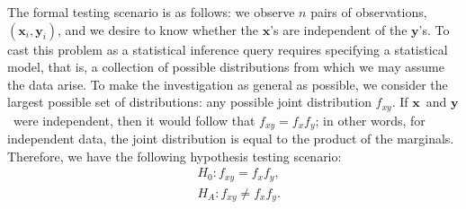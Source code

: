 \documentclass[11pt]{article}
\providecommand{\mb}[1]{\boldsymbol{#1}}
\newcommand{\Real}{\mathbb{R}}
\newcommand{\mbx}{\ensuremath{\mb{x}}}
\newcommand{\mby}{\ensuremath{\mb{y}}}
\begin{document}
The formal testing scenario is as follows: we observe $n$ pairs of observations, $(\mbx_i,\mby_i)$, and we desire to know whether the \mbx's are independent of the \mby's.  To cast this problem as a statistical inference query requires specifying a statistical model, that is, a collection of possible distributions from which we may assume the data arise.  To make the investigation as general as possible, we consider the largest possible set of distributions: any possible joint distribution $f_{xy}$. If \mbx~and \mby~were independent, then it would follow that $f_{xy}=f_x f_y$; in other words, for independent data, the joint distribution is equal to the product of the marginals.  Therefore, we have the following hypothesis testing scenario:
\begin{align*}
& H_{0}: f_{xy}=f_{x}f_{y},\\
& H_{A}: f_{xy} \neq f_{x}f_{y}.
\end{align*}
\end{document}
